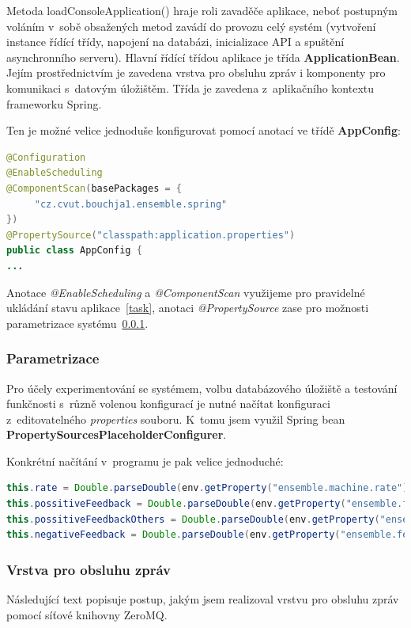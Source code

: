 \documentclass[thesis=M,czech]{FITthesis}[2014/05/07]
\begin{document}
Metoda loadConsoleApplication() hraje roli zavaděče aplikace, neboť postupným voláním v~sobě obsažených metod zavádí do provozu celý systém (vytvoření instance řídící třídy, napojení na databázi, inicializace API a spuštění asynchronního serveru). Hlavní řídící třídou aplikace je třída \textbf{ApplicationBean}. Jejím prostřednictvím je zavedena vrstva pro obsluhu zpráv i komponenty pro komunikaci s~datovým úložištěm. Třída je zavedena z~aplikačního kontextu frameworku Spring.

Ten je možné velice jednoduše konfigurovat pomocí anotací ve třídě \textbf{AppConfig}:

\begin{lstlisting}[language=java]
@Configuration
@EnableScheduling
@ComponentScan(basePackages = {
     "cz.cvut.bouchja1.ensemble.spring"
})
@PropertySource("classpath:application.properties")
public class AppConfig {
...
\end{lstlisting}

Anotace \emph{@EnableScheduling} a \emph{@ComponentScan} využijeme pro pravidelné ukládání stavu aplikace~\ref{task}, anotaci \emph{@PropertySource} zase pro možnosti parametrizace systému~\ref{param}.

\subsubsection{Parametrizace}
\label{param}
Pro účely experimentování se systémem, volbu databázového úložiště a testování funkčnosti s~různě volenou konfigurací je nutné načítat konfiguraci z~editovatelného \emph{properties} souboru. K~tomu jsem využil Spring bean \textbf{PropertySourcesPlaceholderConfigurer}.

Konkrétní načítání v~programu je pak velice jednoduché:

\begin{lstlisting}[language=java]
this.rate = Double.parseDouble(env.getProperty("ensemble.machine.rate"));
this.possitiveFeedback = Double.parseDouble(env.getProperty("ensemble.feedback.possitive.winner"));
this.possitiveFeedbackOthers = Double.parseDouble(env.getProperty("ensemble.feedback.possitive.losers"));
this.negativeFeedback = Double.parseDouble(env.getProperty("ensemble.feedback.negative.stupid"));
\end{lstlisting}

\subsubsection{Vrstva pro obsluhu zpráv}
\label{sub:messvrs}
Následující text popisuje postup, jakým jsem realizoval vrstvu pro obsluhu zpráv pomocí síťové knihovny ZeroMQ.
\end{document}
